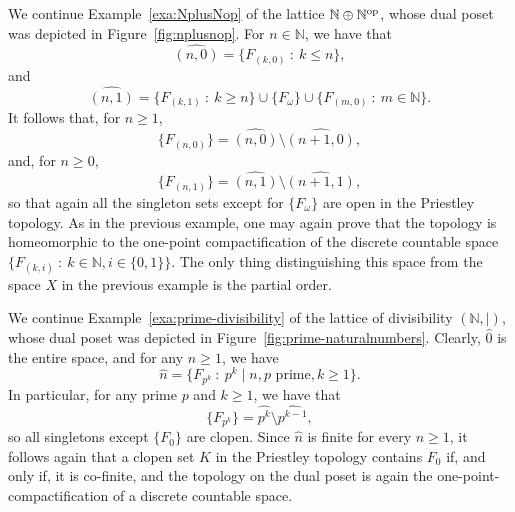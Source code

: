 \begin{example}\label{exa:NplusNop-top}
  We continue Example~\ref{exa:NplusNop} of the lattice $\mathbb{N} \oplus \mathbb{N}^{\mathrm{op}}$, whose dual poset was depicted in Figure~\ref{fig:nplusnop}. For $n \in \mathbb{N}$, we have that
  \[ \widehat{(n,0)} = \{ F_{(k,0)} \ \colon \ k \leq n\}, \] and 
  \[ \widehat{(n,1)} = \{ F_{(k,1)} \ \colon \ k \geq n\} \cup \{ F_\omega \} \cup \{ F_{(m,0)} \ \colon \ m \in \mathbb{N}\}.\] 
  It follows that, for $n \geq 1$,
  \[\{F_{(n,0)}\} = \widehat{(n,0)} \setminus \widehat{(n+1,0)},\] and, for $n \geq 0$,
  \[\{F_{(n,1)}\} = \widehat{(n,1)} \setminus \widehat{(n+1,1)},\] so that again all the singleton sets except for $\{F_{\omega}\}$ are open in the Priestley topology. As in the previous example, one may again prove that the topology is homeomorphic to the one-point compactification of the discrete countable space $\{F_{(k,i)} \ \colon \ k \in \mathbb{N}, i \in \{0,1\}\}$. The only thing distinguishing this space from the space $X$ in the previous example is the partial order. %
\end{example}

\begin{example}\label{exa:primenumbers-topology}
  We continue Example~\ref{exa:prime-divisibility} of the lattice of divisibility $(\mathbb{N}, |)$, whose dual poset was depicted in Figure~\ref{fig:prime-naturalnumbers}. Clearly, $\widehat{0}$ is the entire space, and for any $n \geq 1$, we have 
  \[ \widehat{n} = \{ F_{p^k} \ \colon \ p^k \mid n, p \text{ prime}, k \geq 1 \}.\]
  In particular, for any prime $p$ and $k \geq 1$, we have that
  \[ \{F_{p^k}\} = \widehat{p^k} \setminus \widehat{p^{k-1}},\]
  so all singletons except $\{F_0\}$ are clopen.  Since $\widehat{n}$ is finite for every $n \geq 1$, it follows again that a clopen set $K$ in the Priestley topology contains $F_0$ if, and only if, it is co-finite, and the topology on the dual poset is again the one-point-compactification of a discrete countable space.
\end{example}

